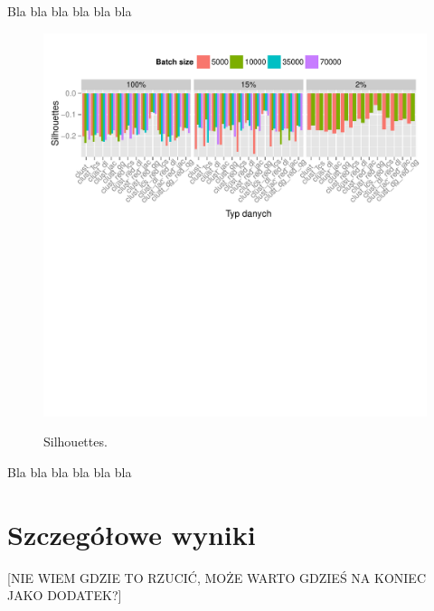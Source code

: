 \documentclass{praca1}
\begin{document}
Bla bla bla bla bla bla

\begin{figure}[!h]
  \centering
  \includegraphics[width=400pt]{plot18.pdf}\\
  \caption{Silhouettes.}\label{plot:009}
\end{figure}

Bla bla bla bla bla bla

\section{Szczegółowe wyniki}

[NIE WIEM GDZIE TO RZUCIĆ, MOŻE WARTO GDZIEŚ NA KONIEC JAKO DODATEK?]
\end{document}
